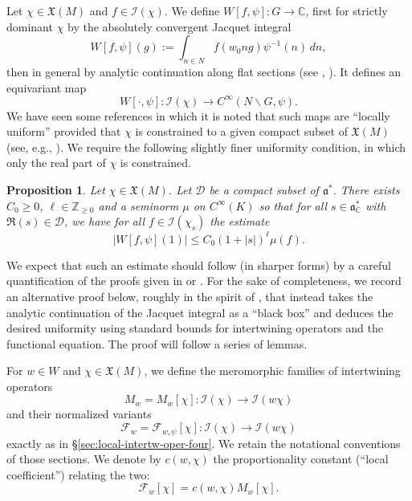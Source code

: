 \documentclass[reqno]{amsart}
\theoremstyle{plain} \newtheorem{theorem} {Theorem}
\newtheorem{proposition} [theorem] {Proposition}
\theoremstyle{definition} \newtheorem{definition} [theorem] {Definition}
\theoremstyle{itplain} %
\numberwithin{equation}{section}
\numberwithin{theorem}{section}
\renewcommand{\geq}{\geqslant}
\renewcommand{\leq}{\leqslant}
\begin{document}
Let $\chi \in \mathfrak{X}(M)$ and $f \in \mathcal{I}(\chi)$.  We define $W[f,\psi] : G \rightarrow \mathbb{C}$, first for strictly dominant $\chi$ by the absolutely convergent Jacquet integral
\begin{equation}\label{eq:wf-psig-:whittaker-analytic}
  W[f,\psi](g) := \int _{n \in N } f (w_0 n g) \psi^{-1}(n) \, d n,
\end{equation}
then in general by analytic continuation along flat sections (see \cite{MR563369}, \cite[\S15.4]{MR1170566}).  It defines an equivariant map
\begin{equation*}
  W[\cdot, \psi] : \mathcal{I}(\chi) \rightarrow C^\infty(N \backslash G, \psi).
\end{equation*}
We have seen some references in which it is noted that such maps are ``locally uniform'' provided that $\chi$ is constrained to a given compact subset of $\mathfrak{X}(M)$  (see, e.g., \cite[\S3.5]{MR2533003}).  We require the following slightly finer uniformity condition, in which only the real part of $\chi$ is constrained.
\begin{proposition}\label{prop:jacquet-integral-uniformity-question:let-eta-be}
  Let $\chi \in \mathfrak{X}(M)$.  Let $\mathcal{D}$ be a compact subset of $\mathfrak{a}^*$.  There exists $C_0 \geq 0$, $\ell \in \mathbb{Z}_{\geq 0}$ and a seminorm $\mu$ on $C^\infty(K)$ so that for all $s \in \mathfrak{a}_{\mathbb{C}}^*$ with $\Re(s) \in \mathcal{D}$, we have for all $f \in \mathcal{I}(\chi_s)$ the estimate
\begin{equation*}
  |W[f,\psi](1)|
  \leq
  C_0
  (1 + |s|)^{\ell}
  \mu(f).
\end{equation*}
\end{proposition}
We expect that such an estimate should follow (in sharper forms) by a careful quantification of the proofs given in \cite{MR563369} or \cite[\S15.4]{MR1170566}.  For the sake of completeness, we record an alternative proof below, roughly in the spirit of \cite[Proof of Lemma 5.6]{MR1800349}, that instead takes the analytic continuation of the Jacquet integral as a ``black box'' and deduces the desired uniformity using standard bounds for intertwining operators and the functional equation.  The proof will follow a series of lemmas.

For $w \in W$ and $\chi \in \mathfrak{X}(M)$, we define the meromorphic families of intertwining operators
\begin{equation*}
  M_w = M_w[\chi] : \mathcal{I}(\chi) \rightarrow \mathcal{I}(w \chi)
\end{equation*}
and their normalized variants
\begin{equation*}
  \mathcal{F}_w = \mathcal{F}_{w,\psi}[\chi] : \mathcal{I}(\chi) \rightarrow \mathcal{I}(w \chi)
\end{equation*}
exactly as in \S\ref{sec:local-intertw-oper-four}.  We retain the notational conventions of those sections.  We denote by $c(w,\chi)$ the proportionality constant (``local coefficient'') relating the two:
\begin{equation*}
  \mathcal{F}_w[\chi] = c(w,\chi) M_w[\chi].
\end{equation*}
\end{document}
